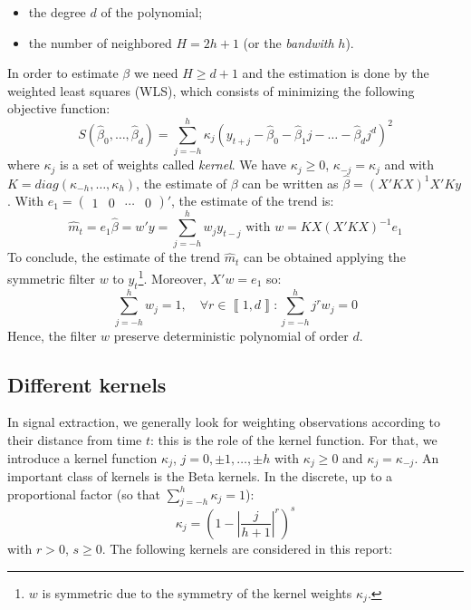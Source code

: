 \documentclass[
  12pt,
  ,
  a4paper]{article}
\newcommand\1{\mathds{1}}
\begin{document}
\begin{itemize}
\item
  the degree \(d\) of the polynomial;
\item
  the number of neighbored \(H=2h+1\) (or the \emph{bandwith} \(h\)).
\end{itemize}

In order to estimate \(\beta\) we need \(H\geq d+1\) and the estimation is done by the weighted least squares (WLS), which consists of minimizing the following objective function:
\[
S(\hat{\beta}_{0},\dots,\hat{\beta}_{d})=\sum_{j=-h}^{h}\kappa_{j}(y_{t+j}-\hat{\beta}_{0}-\hat{\beta}_{1}j-\dots-\hat{\beta}_{d}j^{d})^{2}
\]
where \(\kappa_j\) is a set of weights called \emph{kernel}. We have \(\kappa_j\geq 0\), \(\kappa_{-j}=\kappa_j\) and with \(K=diag(\kappa_{-h},\dots,\kappa_{h})\), the estimate of \(\beta\) can be written as \(\hat{\beta}=(X'KX)^{1}X'Ky\).
With \(e_{1}=\begin{pmatrix}1&0&\cdots&0\end{pmatrix}'\), the estimate of the trend is:
\[
\hat{m}_{t}=e_{1}\hat{\beta}=w'y=\sum_{j=-h}^{h}w_{j}y_{t-j}\text{ with }w=KX(X'KX)^{-1}e_{1}
\]
To conclude, the estimate of the trend \(\hat{m}_{t}\) can be obtained applying the symmetric filter \(w\) to \(y_t\)\footnote{\(w\) is symmetric due to the symmetry of the kernel weights \(\kappa_j\).}.
Moreover, \(X'w=e_{1}\) so:
\[
\sum_{j=-h}^{h}w_{j}=1,\quad\forall r\in\left\llbracket 1,d\right\rrbracket :\sum_{j=-h}^{h}j^{r}w_{j}=0
\]
Hence, the filter \(w\) preserve deterministic polynomial of order \(d\).

\hypertarget{sec:kernels}{%
\subsection{Different kernels}\label{sec:kernels}}

In signal extraction, we generally look for weighting observations according to their distance from time \(t\): this is the role of the kernel function.
For that, we introduce a kernel function \(\kappa_j\), \(j=0,\pm1,\dots,\pm h\) with \(\kappa_j \geq0\) and \(\kappa_j=\kappa_{-j}\).
An important class of kernels is the Beta kernels. In the discrete, up to a proportional factor (so that \(\sum_{j=-h}^h\kappa_j=1\)):
\[
\kappa_j = \left(
  1-
  \left\lvert
  \frac j {h+1}
  \right\lvert^r
\right)^s
\]
with \(r>0\), \(s\geq 0\). The following kernels are considered in this report:
\end{document}
